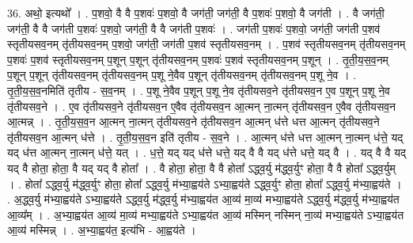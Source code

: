 \documentclass[17pt]{extarticle}
\begin{document}
36. अथो॒ इत्यथो᳚ । . प॒शवो॒ वै वै प॒शवः॑ प॒शवो॒ वै जग॑ती॒ जग॑ती॒ वै प॒शवः॑ प॒शवो॒ वै जग॑ती । . वै जग॑ती॒ जग॑ती॒ वै वै जग॑ती प॒शवः॑ प॒शवो॒ जग॑ती॒ वै वै जग॑ती प॒शवः॑ । . जग॑ती प॒शवः॑ प॒शवो॒ जग॑ती॒ जग॑ती प॒शव॑ स्तृतीयसव॒नम् तृ॑तीयसव॒नम् प॒शवो॒ जग॑ती॒ जग॑ती प॒शव॑ स्तृतीयसव॒नम् । . प॒शव॑ स्तृतीयसव॒नम् तृ॑तीयसव॒नम् प॒शवः॑ प॒शव॑ स्तृतीयसव॒नम् प॒शून् प॒शून् तृ॑तीयसव॒नम् प॒शवः॑ प॒शव॑ स्तृतीयसव॒नम् प॒शून् । . तृ॒ती॒य॒स॒व॒नम् प॒शून् प॒शून् तृ॑तीयसव॒नम् तृ॑तीयसव॒नम् प॒शू ने॒वैव प॒शून् तृ॑तीयसव॒नम् तृ॑तीयसव॒नम् प॒शू ने॒व । . तृ॒ती॒य॒स॒व॒नमिति॑ तृतीय - स॒व॒नम् । . प॒शू ने॒वैव प॒शून् प॒शू ने॒व तृ॑तीयसव॒ने तृ॑तीयसव॒न ए॒व प॒शून् प॒शू ने॒व तृ॑तीयसव॒ने । . ए॒व तृ॑तीयसव॒ने तृ॑तीयसव॒न ए॒वैव तृ॑तीयसव॒न आ॒त्मन् ना॒त्मन् तृ॑तीयसव॒न ए॒वैव तृ॑तीयसव॒न आ॒त्मन्न् । . तृ॒ती॒य॒स॒व॒न आ॒त्मन् ना॒त्मन् तृ॑तीयसव॒ने तृ॑तीयसव॒न आ॒त्मन् ध॑त्ते धत्त आ॒त्मन् तृ॑तीयसव॒ने तृ॑तीयसव॒न आ॒त्मन् ध॑त्ते । . तृ॒ती॒य॒स॒व॒न इति॑ तृतीय - स॒व॒ने । . आ॒त्मन् ध॑त्ते धत्त आ॒त्मन् ना॒त्मन् ध॑त्ते॒ यद् यद् ध॑त्त आ॒त्मन् ना॒त्मन् ध॑त्ते॒ यत् । . ध॒त्ते॒ यद् यद् ध॑त्ते धत्ते॒ यद् वै वै यद् ध॑त्ते धत्ते॒ यद् वै । . यद् वै वै यद् यद् वै होता॒ होता॒ वै यद् यद् वै होता᳚ । . वै होता॒ होता॒ वै वै होता᳚ ऽद्ध्व॒र्यु म॑द्ध्व॒र्युꣳ होता॒ वै वै होता᳚ ऽद्ध्व॒र्युम् । . होता᳚ ऽद्ध्व॒र्यु म॑द्ध्व॒र्युꣳ होता॒ होता᳚ ऽद्ध्व॒र्यु म॑भ्या॒ह्वय॑ते ऽभ्या॒ह्वय॑ते ऽद्ध्व॒र्युꣳ होता॒ होता᳚ ऽद्ध्व॒र्यु म॑भ्या॒ह्वय॑ते । . अ॒द्ध्व॒र्यु म॑भ्या॒ह्वय॑ते ऽभ्या॒ह्वय॑ते ऽद्ध्व॒र्यु म॑द्ध्व॒र्यु म॑भ्या॒ह्वय॑त आ॒व्य॑ मा॒व्य॑ मभ्या॒ह्वय॑ते ऽद्ध्व॒र्यु म॑द्ध्व॒र्यु म॑भ्या॒ह्वय॑त आ॒व्य᳚म् । . अ॒भ्या॒ह्वय॑त आ॒व्य॑ मा॒व्य॑ मभ्या॒ह्वय॑ते ऽभ्या॒ह्वय॑त आ॒व्य॑ मस्मिन् नस्मिन् ना॒व्य॑ मभ्या॒ह्वय॑ते ऽभ्या॒ह्वय॑त आ॒व्य॑ मस्मिन्न् । . अ॒भ्या॒ह्वय॑त॒ इत्य॑भि - आ॒ह्वय॑ते । \newline
\end{document}
